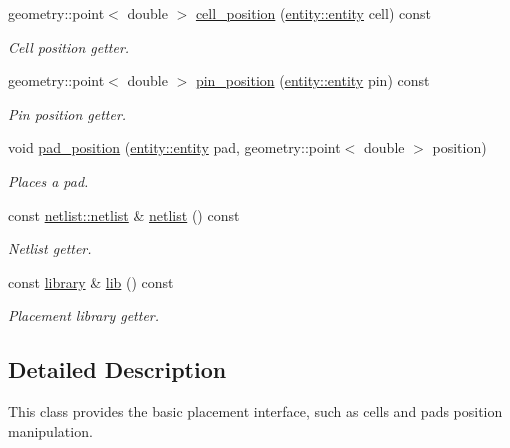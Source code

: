 \begin{DoxyCompactItemize}
geometry\-::point$<$ double $>$ \hyperlink{classophidian_1_1placement_1_1placement_aba861767e53a39ff2d8bd140b7fb0fb5}{cell\-\_\-position} (\hyperlink{classophidian_1_1entity_1_1entity}{entity\-::entity} cell) const 
\begin{DoxyCompactList}\small\item\em Cell position getter. \end{DoxyCompactList}\item 
geometry\-::point$<$ double $>$ \hyperlink{classophidian_1_1placement_1_1placement_a70d1c601c56722a462af15dab5911bbe}{pin\-\_\-position} (\hyperlink{classophidian_1_1entity_1_1entity}{entity\-::entity} pin) const 
\begin{DoxyCompactList}\small\item\em Pin position getter. \end{DoxyCompactList}\item 
void \hyperlink{classophidian_1_1placement_1_1placement_ad1ae71e6cdc5fb4db7b9f3c0e6cbae23}{pad\-\_\-position} (\hyperlink{classophidian_1_1entity_1_1entity}{entity\-::entity} pad, geometry\-::point$<$ double $>$ position)
\begin{DoxyCompactList}\small\item\em Places a pad. \end{DoxyCompactList}\item 
const \hyperlink{classophidian_1_1netlist_1_1netlist}{netlist\-::netlist} \& \hyperlink{classophidian_1_1placement_1_1placement_a2e1a15ace1eb476ea2f7ce6d8d84e3c3}{netlist} () const 
\begin{DoxyCompactList}\small\item\em Netlist getter. \end{DoxyCompactList}\item 
const \hyperlink{classophidian_1_1placement_1_1library}{library} \& \hyperlink{classophidian_1_1placement_1_1placement_a302206279c67c772dff944b9fd4d19fb}{lib} () const 
\begin{DoxyCompactList}\small\item\em Placement library getter. \end{DoxyCompactList}\end{DoxyCompactItemize}


\subsection{Detailed Description}
This class provides the basic placement interface, such as cells and pads position manipulation. 

